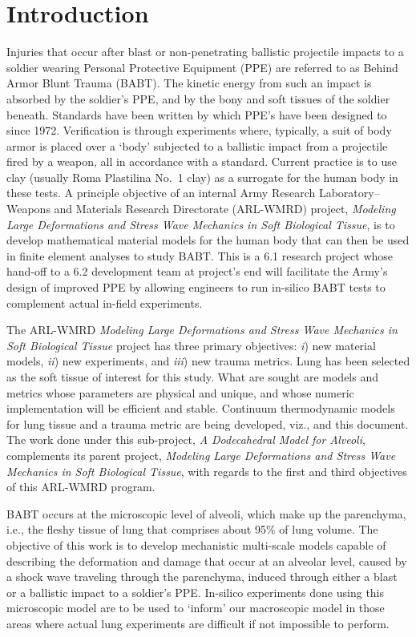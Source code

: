 \part{Introduction}
\label{partIntroduction}

Injuries that occur after blast or non-penetrating ballistic projectile impacts to a soldier wearing Personal Protective Equipment (PPE) are referred to as Behind Armor Blunt Trauma (BABT).  The kinetic energy from such an impact is absorbed by the soldier's PPE, and by the bony and soft tissues of the soldier beneath.  Standards have been written by which PPE's have been designed to since 1972.  Verification is through experiments where, typically, a suit of body armor is placed over a `body' subjected to a ballistic impact from a projectile fired by a weapon, all in accordance with a standard.  Current practice is to use clay (usually Roma Plastilina No.~1 clay) as a surrogate for the human body in these tests.  A principle objective of an internal Army Research Laboratory--Weapons and Materials Research Directorate (ARL-WMRD) project, \textit{Modeling Large Deformations and Stress Wave Mechanics in Soft Biological Tissue}, is to develop mathematical material models for the human body that can then be used in finite element analyses to study BABT.  This is a 6.1 research project whose hand-off to a 6.2 development team at project's end will facilitate the Army's design of improved PPE by allowing engineers to run in-silico BABT tests to complement actual in-field experiments.

The ARL-WMRD \textit{Modeling Large Deformations and Stress Wave Mechanics in Soft Biological Tissue\/} project has three primary objectives: \textit{i\/}) new material models, \textit{ii\/}) new experiments, and \textit{iii\/}) new trauma metrics.  Lung has been selected as the soft tissue of interest for this study.  What are sought are models and metrics whose parameters are physical and unique, and whose numeric implementation will be efficient and stable.  Continuum thermo\-dynamic models for lung tissue and a trauma metric are being developed, viz., \cite{ClaytonFreed19} and this document.  The work done under this sub-project, \textit{A Dodecahedral Model for Alveoli}, complements its parent project, \textit{Modeling Large Deformations and Stress Wave Mechanics in Soft Biological Tissue}, with regards to the first and third objectives of this ARL-WMRD program. 

BABT occurs at the microscopic level of alveoli, which make up the parenchyma, i.e., the fleshy tissue of lung that comprises about 95\% of lung volume.  The objective of this work is to develop mechanistic multi-scale models capable of describing the deformation and damage that occur at an alveolar level, caused by a shock wave traveling through the parenchyma, induced through either a blast or a ballistic impact to a soldier's PPE.  In-silico experiments done using this microscopic model are to be used to `inform' our macroscopic model in those areas where actual lung experiments are difficult if not impossible to perform.

